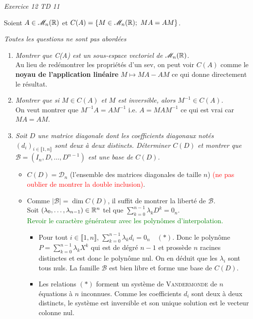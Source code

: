 \emph{Exercice 12 TD 11}

\begin{tcolorbox}
    Soient $A \in \mathscr{M}_n(\mathbb{R})$ et $C(A) = \{ M \in \mathscr{M}_n(\mathbb{R});\ MA = AM \}$.
\end{tcolorbox}

\emph{Toutes les questions ne sont pas abordées}

\begin{enumerate}
    \item \emph{Montrer que C(A) est un sous-espace vectoriel de $\mathscr{M}_n(\mathbb{R})$.} \\
    Au lieu de redémontrer les propriétés d'un sev, on peut voir $C(A)$ comme le \textbf{noyau de l'application linéaire} $M \mapsto MA - AM$ ce qui donne directement le résultat. 
    \item \emph{Montrer que si $M \in C(A)$ et $M$ est inversible, alors $M^{-1} \in C(A)$.} \\
    On veut montrer que $M^{-1} A = A M^{-1}$ i.e. $A = M A M^{-1}$ ce qui est vrai car $M A = A M$.
    \item \emph{Soit $D$ une matrice diagonale dont les coefficients diagonaux notés $(d_i)_{i \in \llbracket 1, n \rrbracket}$ sont deux à deux distincts. Déterminer $C(D)$ et montrer que $\mathscr{B} = (I_n, D, \dots, D^{n-1})$ est une base de $C(D)$.}
    \begin{itemize}
        \item $C(D) = \mathscr{D}_n$ (l'ensemble des matrices diagonales de taille $n$) \textcolor{red}{(ne pas oublier de montrer la double inclusion)}.
        \item Comme $| \mathscr{B} | = \dim C(D)$, il suffit de montrer la liberté de $\mathscr{B}$. \\
        Soit $(\lambda_0, \dots, \lambda_{n-1}) \in \mathbb{R}^n$ tel que $\sum\limits_{k=0}^{n-1} \lambda_k D^k = 0_n$. \\
        \textcolor{green}{Revoir le caractère générateur avec les polynômes d'interpolation.}
        \begin{itemize}
            \item Pour tout $i \in \llbracket 1, n \rrbracket$, $\sum\limits_{k=0}^{n-1} \lambda_k d_i = 0_n \quad (*)$. Donc le polynôme $P = \sum\limits_{k=0}^{n-1} \lambda_k X^k$ qui est de dégré $n-1$ et prossède $n$ racines distinctes et est donc le polynôme nul. On en déduit que les $\lambda_i$ sont tous nuls. La famille $\mathscr{B}$ est bien libre et forme une base de $C(D)$.
            \item Les relations $(*)$ forment un système de \textsc{Vandermonde} de $n$ équations à $n$ inconnues. Comme les coefficients $d_i$ sont deux à deux distincts, le système est inversible et son unique solution est le vecteur colonne nul.

\end{itemize}
\end{itemize}
\end{enumerate}
